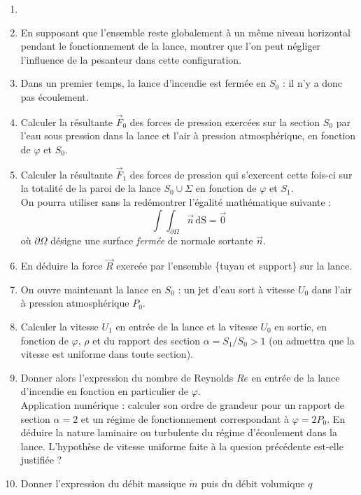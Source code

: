 {\begin{enumerate}
\item[]
\item
En supposant que l'ensemble reste globalement 
\`a un m\^eme niveau horizontal pendant le fonctionnement
de la lance, montrer que l'on peut n\'egliger l'influence de la pesanteur
dans cette configuration.
\item[]
Dans un premier temps, la lance d'incendie est ferm\'ee en $S_0$ :
il n'y a donc pas \'ecoulement.
\item
Calculer la r\'esultante $\vec{F}_0$ des forces de pression 
exerc\'ees sur la section
$S_0$ par l'eau sous pression dans la lance et l'air \`a pression
atmosph\'erique, en fonction de $\varphi$ et $S_0$.
\item
Calculer la r\'esultante $\vec{F}_1$ des forces de pression qui s'exercent
cette fois-ci sur la totalit\'e de la paroi de la lance
$S_0 \cup \Sigma$ en fonction de $\varphi$ et $S_1$.
\\
On pourra utiliser sans la red\'emontrer l'\'egalit\'e math\'ematique
suivante :
\[
\int\!\!\!\int_{\partial \Omega} \vec{n} \, \mbox{dS} = \vec{0}
\]
o\`u $\partial \Omega$ d\'esigne une surface \textit{ferm\'ee} de normale
sortante $\vec{n}$.
\item
En d\'eduire la force $\vec{R}$ 
exerc\'ee par l'ensemble \{tuyau et support\} sur la lance.
\item[]
On ouvre maintenant la lance en $S_0$ : un jet d'eau sort \`a vitesse $U_0$
dans l'air \`a pression atmosph\'erique $P_0$.
\item
Calculer la vitesse $U_1$ en entr\'ee de la lance et
la vitesse $U_0$ en sortie, en fonction de $\varphi$, $\rho$ et du rapport
des section $\alpha = S_1/S_0 > 1$ (on admettra que la vitesse est uniforme dans toute section).
\item
Donner alors l'expression du nombre de Reynolds $Re$ en entr\'ee de la lance
d'incendie en fonction en particulier de $\varphi$. \\
Application num\'erique : calculer son ordre de grandeur pour un rapport
de section $\alpha=2$ et un r\'egime de fonctionnement correspondant \`a
$\varphi = 2P_0$.
En d\'eduire la nature laminaire ou turbulente du r\'egime d'\'ecoulement
dans la lance. L'hypoth\`ese de vitesse uniforme faite \`a la quesion pr\'ec\'edente est-elle justifi\'ee ?
\item
Donner l'expression du d\'ebit massique $\dot{m}$ puis du d\'ebit volumique $q$

\end{enumerate}}
